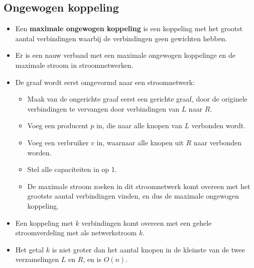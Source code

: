 \subsection{Ongewogen koppeling}
\begin{itemize}
    \item Een \textbf{maximale ongewogen koppeling} is een koppeling met het grootst aantal verbindingen waarbij de verbindingen geen gewichten hebben.
    \item Er is een nauw verband met een maximale ongewogen koppelinge en de maximale stroom in stroomnetwerken.
    \item De graaf wordt eerst omgevormd naar een stroomnetwerk:
    \begin{itemize}
        \item Maak van de ongerichte graaf eerst een gerichte graaf, door de originele verbindingen te vervangen door verbindingen van $L$ naar $R$.
        \item Voeg een producent $p$ in, die naar alle knopen van $L$ verbonden wordt. 
        \item Voeg een verbruiker $v$ in, waarnaar alle knopen uit $R$ naar verbonden worden.
        \item Stel alle capaciteiten in op 1.
        \item De maximale stroom zoeken in dit stroomnetwerk komt overeen met het grootste aantal verbindingen vinden, en dus de maximale ongewogen koppeling.
    \end{itemize}
    \item Een koppeling met $k$ verbindingen komt overeen met een gehele stroomverdeling met als netwerkstroom $k$.
    \item Het getal $k$ is niet groter dan het aantal knopen in de kleinste van de twee verzamelingen $L$ en $R$, en is $O(n)$.
\end{itemize}

